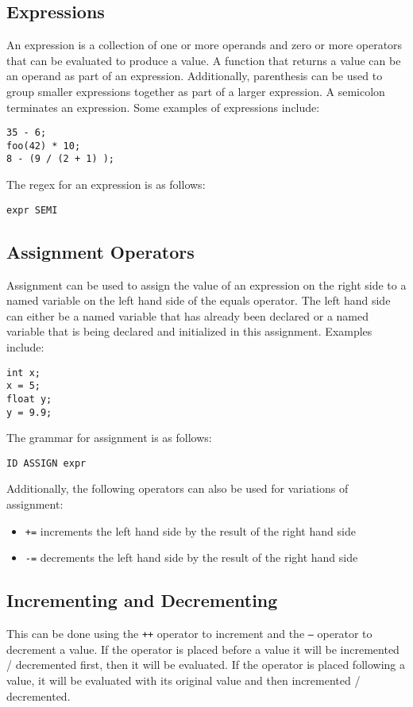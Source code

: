 \documentclass{article}
\begin{document}
\subsection{Expressions}
An expression is a collection of one or more operands and zero or more operators that can be evaluated to produce a value.  A function that returns a value can be an operand as part of an expression.  Additionally, parenthesis can be used to group smaller expressions together as part of a larger expression.  A semicolon terminates an expression.  Some examples of expressions include:
\begin{lstlisting}
35 - 6;
foo(42) * 10;
8 - (9 / (2 + 1) );
\end{lstlisting}

The regex for an expression is as follows:
\begin{Verbatim}[frame=single]
expr SEMI
\end{Verbatim}

\subsection{Assignment Operators}
Assignment can be used to assign the value of an expression on the right side to a named variable on the left hand side of the equals operator.  The left hand side can either be a named variable that has already been declared or a named variable that is being declared and initialized in this assignment.  Examples include:
\begin{lstlisting}
int x;
x = 5;
float y;
y = 9.9;
\end{lstlisting}

The grammar for assignment is as follows:
\begin{Verbatim}[frame=single]
ID ASSIGN expr
\end{Verbatim}

Additionally, the following operators can also be used for variations of assignment:

\begin{itemize}
\item \texttt{+=} increments the left hand side by the result of the right hand side
\item \texttt{-=} decrements the left hand side by the result of the right hand side
\end{itemize}

\subsection{Incrementing and Decrementing}
This can be done using the \texttt{++} operator to increment and the \texttt{--} operator to decrement a value.  If the operator is placed before a value it will be incremented / decremented first, then it will be evaluated.  If the operator is placed following a value, it will be evaluated with its original value and then incremented / decremented.
\end{document}

